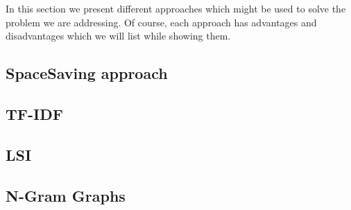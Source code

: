 In this section we present different approaches which might be used to solve the problem we are addressing. Of course, each approach has advantages and disadvantages which we will list while showing them.

\subsection*{SpaceSaving approach}


\subsection*{TF-IDF}


\subsection*{LSI}


\subsection*{N-Gram Graphs}

